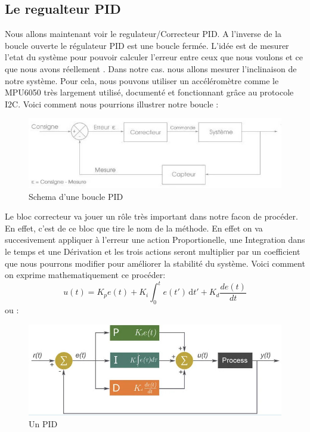 \documentclass[10pt,a4paper]{article}
\begin{document}
 \subsection{Le regualteur PID}
 Nous allons maintenant voir le regulateur/Correcteur PID. A l'inverse de la boucle ouverte le régulateur PID est une boucle fermée. L'idée est de mesurer l'etat du système pour pouvoir calculer l'erreur entre ceux que nous voulons et ce que nous avons réellement . Dans notre cas. nous allons mesurer l'inclinaison de notre système. Pour cela, nous pouvons utiliser un accéléromètre comme le MPU6050 très largement utilisé, documenté et fonctionnant grâce au protocole I2C. Voici comment nous pourrions illustrer notre boucle :
   \begin{figure}[h!]
\centering
\includegraphics[scale=0.400]{image/SchemaPID.jpg}
\caption{Schema d'une boucle PID}
\label{fig:net }
\end{figure}

Le bloc correcteur va jouer un rôle très important dans notre facon de procéder. En effet, c'est de ce bloc que tire le nom de la méthode. En effet on va succesivement appliquer à l'erreur une action Proportionelle, une Integration dans le temps et une Dérivation et les trois actions seront multiplier par un coefficient que nous pourrons modifier pour améliorer la stabilité du système. Voici comment on exprime mathematiquement ce procéder: \\
\begin{equation}\label{xx}
 u(t) = K_{p}e(t)+K_{i}\int_{0}^{t} e(t') \, \mathrm{d}t'+K_{d}\frac{de(t)}{dt}
\end{equation}
ou :
   \begin{figure}[h!]
\centering
\includegraphics[scale=0.400]{image/IllustrationGrapPID.jpg}
\caption{Un PID}
\label{fig:net }
\end{figure}
\end{document}
